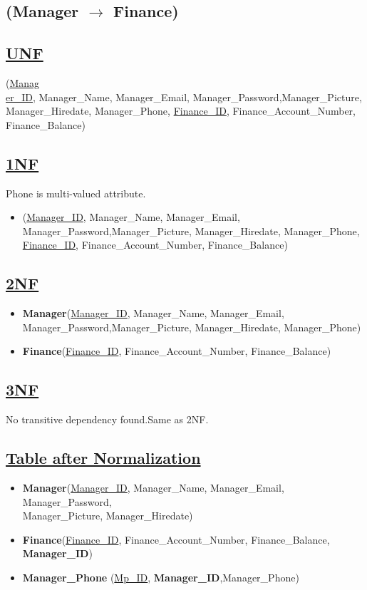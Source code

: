 \subsection{\texorpdfstring{\centering (Manager  $\rightarrow$ Finance)}{(Manager - Finance)}}

\subsection*{\underline{UNF}}

(\underline{Manag\\er\_ID}, Manager\_Name, Manager\_Email, Manager\_Password,Manager\_Picture, Manager\_Hiredate, Manager\_Phone,
\underline{Finance\_ID}, Finance\_Account\_Number, Finance\_Balance)

\subsection*{\underline{1NF}}
Phone is multi-valued attribute.
\vskip 0.2in

\begin{itemize}
    \item
          (\underline{Manager\_ID}, Manager\_Name, Manager\_Email, Manager\_Password,Manager\_Picture, Manager\_Hiredate, Manager\_Phone,
          \underline{Finance\_ID}, Finance\_Account\_Number, Finance\_Balance)
\end{itemize}

\subsection*{\underline{2NF}}
\begin{itemize}
    \item \textbf{Manager}(\underline{Manager\_ID}, Manager\_Name, Manager\_Email, Manager\_Password,Manager\_Picture, Manager\_Hiredate, Manager\_Phone)
    \item \textbf{Finance}(\underline{Finance\_ID}, Finance\_Account\_Number, Finance\_Balance)
\end{itemize}

\subsection*{\underline{3NF}}
No transitive dependency found.Same as 2NF.

\subsection*{\underline{Table after Normalization}}
\begin{itemize}
    \item \textbf{Manager}(\underline{Manager\_ID}, Manager\_Name, Manager\_Email, Manager\_Password,\\Manager\_Picture, Manager\_Hiredate)
    \item \textbf{Finance}(\underline{Finance\_ID}, Finance\_Account\_Number, Finance\_Balance,\textbf{ Manager\_ID})
    \item \textbf{Manager\_Phone} (\underline{Mp\_ID}, \textbf{Manager\_ID},{Manager\_Phone})
\end{itemize}
\clearpage